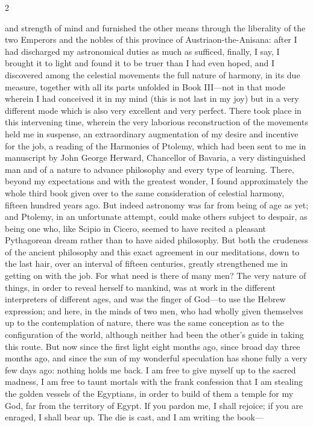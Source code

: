 \documentclass{article}
\begin{document}
2

and strength of mind and furnished the other means through the
liberality of the two Emperors and the nobles of this province of Austriaon-the-Anisana: after I had discharged my astronomical duties as much
as sufficed, finally, I say, I brought it to light and found it to be truer than
I had even hoped, and I discovered among the celestial movements the
full nature of harmony, in its due measure, together with all its parts
unfolded in Book III—not in that mode wherein I had conceived it in my
mind (this is not last in my joy) but in a very different mode which is also
very excellent and very perfect. There took place in this intervening time,
wherein the very laborious reconstruction of the movements held me in
suspense, an extraordinary augmentation of my desire and incentive for
the job, a reading of the Harmonies of Ptolemy, which had been sent to
me in manuscript by John George Herward, Chancellor of Bavaria, a
very distinguished man and of a nature to advance philosophy and every
type of learning. There, beyond my expectations and with the greatest
wonder, I found approximately the whole third book given over to the
same consideration of celestial harmony, fifteen hundred years ago. But
indeed astronomy was far from being of age as yet; and Ptolemy, in an
unfortunate attempt, could make others subject to despair, as being one
who, like Scipio in Cicero, seemed to have recited a pleasant Pythagorean
dream rather than to have aided philosophy. But both the crudeness of
the ancient philosophy and this exact agreement in our meditations,
down to the last hair, over an interval of fifteen centuries, greatly
strengthened me in getting on with the job. For what need is there of
many men? The very nature of things, in order to reveal herself to
mankind, was at work in the different interpreters of different ages, and
was the finger of God—to use the Hebrew expression; and here, in the
minds of two men, who had wholly given themselves up to the
contemplation of nature, there was the same conception as to the
configuration of the world, although neither had been the other's guide
in taking this route. But now since the first light eight months ago, since
broad day three months ago, and since the sun of my wonderful
speculation has shone fully a very few days ago: nothing holds me back. I
am free to give myself up to the sacred madness, I am free to taunt
mortals with the frank confession that I am stealing the golden vessels of
the Egyptians, in order to build of them a temple for my God, far from
the territory of Egypt. If you pardon me, I shall rejoice; if you are
enraged, I shall bear up. The die is cast, and I am writing the book—
\end{document}
